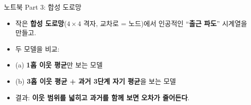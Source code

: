 \begin{frame}{노트북 Part 3: 합성 도로망}
  \begin{itemize}
    \item 작은 \textbf{합성 도로망}($4\times 4$ 격자, 교차로 = 노드)에서
      인공적인 ``\textbf{출근 파도}'' 시계열을 만들고.
    \item 두 모델을 비교:
    \item (a) \textbf{1홉 이웃 평균}만 보는 모델
    \item (b) \textbf{3홉 이웃 평균 + 과거 3단계 자기 평균}을
      보는 모델
    \item 결과: \textbf{이웃 범위를 넓히고 과거를 함께 보면}
      \textbf{오차가 줄어든다}.
  \end{itemize}
\end{frame}
